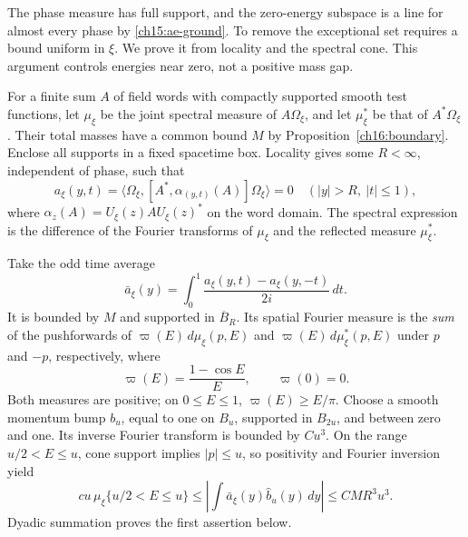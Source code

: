 The phase measure has full support, and the zero-energy subspace is a line
for almost every phase by \eqref{ch15:ae-ground}. To remove the exceptional
set requires a bound uniform in $\xi$. We prove it from locality and the
spectral cone. This argument controls energies near zero, not a positive
mass gap.

For a finite sum $A$ of field words with compactly supported smooth test functions,
let $\mu_\xi$ be the joint spectral measure of $A\Omega_\xi$, and let
$\mu_\xi^*$ be that of $A^*\Omega_\xi$. Their total masses have a common
bound $M$ by Proposition~\ref{ch16:boundary}. Enclose all supports in a
fixed spacetime box. Locality gives some $R<\infty$, independent of phase,
such that
\begin{equation}
 a_\xi(y,t)=\langle\Omega_\xi,[A^*,\alpha_{(y,t)}(A)]\Omega_\xi\rangle=0
                  \quad (|y|>R,\ |t|\le1),
 \label{ch16:local-commutator}
\end{equation}
where $\alpha_z(A)=U_\xi(z)AU_\xi(z)^*$ on the word domain.
The spectral expression is the difference of the Fourier transforms of
$\mu_\xi$ and the reflected measure $\mu_\xi^*$.

Take the odd time average
\[
 \bar a_\xi(y)=\int_0^1
       \frac{a_\xi(y,t)-a_\xi(y,-t)}{2i}\,dt.
\]
It is bounded by $M$ and supported in $\overline B_R$. Its spatial
Fourier measure is the \emph{sum} of the pushforwards of
$\varpi(E)\,d\mu_\xi(p,E)$ and $\varpi(E)\,d\mu_\xi^*(p,E)$ under
$p$ and $-p$, respectively, where
\[
 \varpi(E)=\frac{1-\cos E}{E},\qquad\varpi(0)=0.
\]
Both measures are positive; on $0\le E\le1$,
$\varpi(E)\ge E/\pi$. Choose a smooth momentum bump $b_u$, equal to one
on $B_u$, supported in $B_{2u}$, and between zero and one. Its inverse
Fourier transform is bounded by $Cu^3$. On the range $u/2<E\le u$,
cone support implies $|p|\le u$, so positivity and Fourier inversion yield
\[
 c u\,\mu_\xi\{u/2<E\le u\}
      \le \left|\int\bar a_\xi(y)\widehat b_u(y)\,dy\right|
      \le CMR^3u^3.
\]
Dyadic summation proves the first assertion below.

